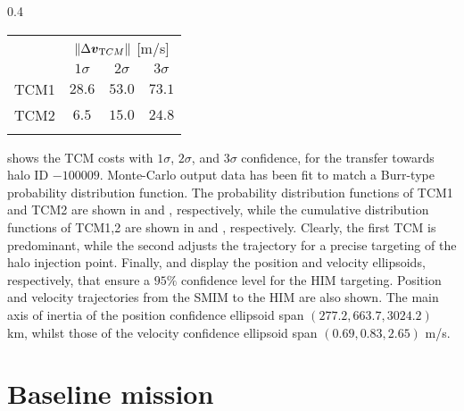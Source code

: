 \begin{figure*}[b!]
%
\begin{wraptable}{}{0.4\textwidth}
	\vspace*{-1.1cm}
	\caption{TCMs confidence.}
	\label{tab:TCMconfidence}
	\centering
	\begin{tabular}{cccc}
		\TOPlines
		\multirow{2}{*}{TCM} & \multicolumn{3}{c}{$\|\Delta\boldsymbol{v}_{\textrm TCM}\|$ [m/s]} \\
		& $1\sigma$ & $2\sigma$ & $3\sigma$ \\
		\MIDline
		TCM1 & $28.6$ & $53.0$ & $73.1$ \\
		TCM2 & $6.5$ & $15.0$ & $24.8$ \\
		\BOTTOMlines
	\end{tabular}
\end{wraptable}
%
 shows the {TCM} costs with $1\sigma$, $2\sigma$, and $3\sigma$ confidence, for the transfer towards halo ID $-100009$. Monte-Carlo output data has been fit to match a Burr-type probability distribution function. The probability distribution functions of TCM1 and TCM2 are shown in  and , respectively, while the cumulative distribution functions of TCM1,2 are shown in  and , respectively. Clearly, the first {TCM} is predominant, while the second adjusts the trajectory for a precise targeting of the halo injection point. Finally,  and  display the position and velocity ellipsoids, respectively, that ensure a $95\%$ confidence level for the {HIM} targeting. Position and velocity trajectories from the {SMIM} to the {HIM} are also shown. The main axis of inertia of the position confidence ellipsoid span $(277.2,663.7,3024.2)$ km, whilst those of the velocity confidence ellipsoid span $(0.69,0.83,2.65)$ m/s.

\section{Baseline mission} \label{sec:baseline_mission}

\end{figure*}
